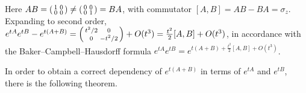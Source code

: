 \documentclass[11pt,a4paper]{article}
\numberwithin{equation}{section}
\theoremstyle{plain}
\theoremstyle{definition}
\theoremstyle{plain}
\theoremstyle{definition}
\begin{document}
\begin{addition}
Here $AB=\begin{psmallmatrix}1&0\\0&0\end{psmallmatrix}\ne\begin{psmallmatrix}0&0\\0&1\end{psmallmatrix}=BA$,
with commutator $[A,B]=AB-BA=\sigma_z$. Expanding to second order,
$e^{tA}e^{tB}-e^{t(A+B)}=\begin{psmallmatrix}t^2/2&0\\0&-t^2/2\end{psmallmatrix}+O(t^3)
=\frac{t^2}2[A,B]+O(t^3)$, in accordance with the Baker--Campbell--Hausdorff formula
$e^{tA}e^{tB}=e^{t(A+B)+\frac{t^2}2[A,B]+O(t^3)}$.
\end{addition}

In order to obtain a correct dependency of $e^{t(A+B)}$ in terms of $e^{tA}$ and $e^{tB}$,
there is the following theorem.
\end{document}
